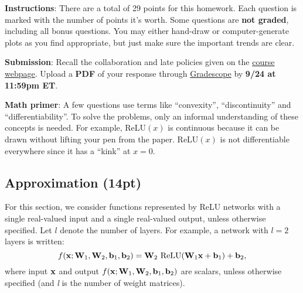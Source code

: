 \documentclass[12pt,letterpaper]{article}
\begin{document}
\textbf{Instructions}: There are a total of 29 points for this homework. Each question is marked with the number of points it's worth. Some questions are \textbf{not graded}, including all bonus questions. You may either hand-draw or computer-generate plots as you find appropriate, but just make sure the important trends are clear.
  
\textbf{Submission}: Recall the collaboration and late policies given on the \href{https://phillipi.github.io/6.7960/}{course webpage}. Upload a \textbf{PDF} of your response through \href{https://www.gradescope.com/courses/599409}{Gradescope} by \textbf{9/24 at 11:59pm ET}.

 \textbf{Math primer}: A few questions use terms like ``convexity'', ``discontinuity'' and ``differentiability''. To solve the problems, only an informal understanding of these concepts is needed. For example, ReLU$(x)$ is continuous because it can be drawn without lifting your pen from the paper. ReLU$(x)$ is not differentiable everywhere since it has a ``kink'' at $x=0$.

\noindent\makebox[\linewidth]{\rule{\linewidth}{0.4pt}}

\vspace{-0.2in}
\subsection*{Approximation (14pt)}
For this section, we consider functions represented by ReLU networks with a single real-valued input and a single real-valued output, unless otherwise specified. Let $l$ denote the number of layers. For example, a network with $l=2$ layers is written: $$f({\mathbf{x}}; {\mathbf{W}}_1, {\mathbf{W}}_2, {\mathbf{b}}_1, {\mathbf{b}}_2) = {\mathbf{W}}_2~\mathrm{ReLU}({\mathbf{W}}_1 {\mathbf{x}} + {\mathbf{b}}_1) + {\mathbf{b}}_2,$$
where input ${\mathbf{x}}$ and output $f({\mathbf{x}}; {\mathbf{W}}_1, {\mathbf{W}}_2, {\mathbf{b}}_1, {\mathbf{b}}_2)$ are scalars, unless otherwise specified (and \textit{l} is the number of weight matrices).
\end{document}
